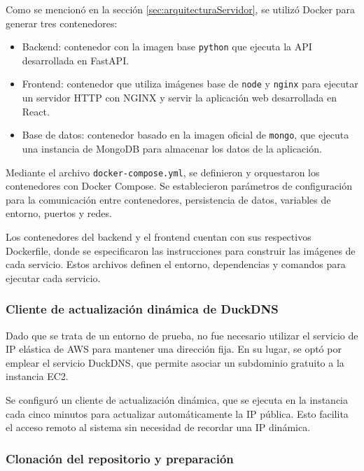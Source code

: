 Como se mencionó en la sección \ref{sec:arquitecturaServidor}, se utilizó
Docker para generar tres contenedores:

\begin{itemize}
    \item Backend: contenedor con la imagen base \texttt{python} que ejecuta la API
          desarrollada en FastAPI.
    \item Frontend: contenedor que utiliza imágenes base de \texttt{node} y
          \texttt{nginx} para ejecutar un servidor HTTP con NGINX \cite{NGINX} y servir
          la aplicación web desarrollada en React.
    \item Base de datos: contenedor basado en la imagen oficial de \texttt{mongo}, que
          ejecuta una instancia de MongoDB para almacenar los datos de la aplicación.
\end{itemize}

Mediante el archivo \texttt{docker-compose.yml}, se definieron y orquestaron
los contenedores con Docker Compose. Se establecieron parámetros de
configuración para la comunicación entre contenedores, persistencia de datos,
variables de entorno, puertos y redes.

Los contenedores del backend y el frontend cuentan con sus respectivos
Dockerfile, donde se especificaron las instrucciones para construir las
imágenes de cada servicio. Estos archivos definen el entorno, dependencias y
comandos para ejecutar cada servicio.

\subsubsection{Cliente de actualización dinámica de DuckDNS}

Dado que se trata de un entorno de prueba, no fue necesario utilizar el
servicio de IP elástica de AWS para mantener una dirección fija. En su lugar,
se optó por emplear el servicio DuckDNS, que permite asociar un subdominio
gratuito a la instancia EC2.

Se configuró un cliente de actualización dinámica, que se ejecuta en la
instancia cada cinco minutos para actualizar automáticamente la IP pública.
Esto facilita el acceso remoto al sistema sin necesidad de recordar una IP
dinámica.

\subsubsection{Clonación del repositorio y preparación}

